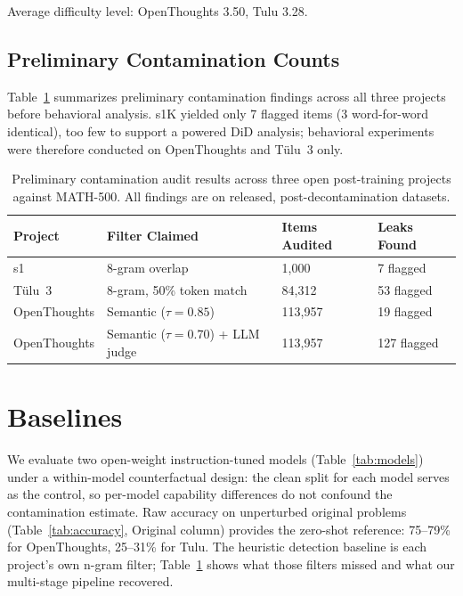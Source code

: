 \documentclass{article} %
\begin{document}
Average difficulty level: OpenThoughts 3.50, Tulu 3.28.

\subsection{Preliminary Contamination Counts}

Table~\ref{tab:contam_counts} summarizes preliminary contamination findings across all three projects before behavioral analysis. s1K yielded only 7 flagged items (3 word-for-word identical), too few to support a powered DiD analysis; behavioral experiments were therefore conducted on OpenThoughts and T\"ulu~3 only.
\begin{table}[t]
\caption{Preliminary contamination audit results across three open post-training projects against MATH-500. All findings are on released, post-decontamination datasets.}
\label{tab:contam_counts}
\begin{center}
\begin{tabular}{llll}
\toprule
\textbf{Project} & \textbf{Filter Claimed} & \textbf{Items Audited} & \textbf{Leaks Found} \\
\midrule
s1 & 8-gram overlap & 1,000 & 7 flagged \\
T\"ulu~3 & 8-gram, 50\% token match & 84,312 & 53 flagged \\
OpenThoughts & Semantic ($\tau{=}0.85$) & 113,957 & 19 flagged \\
OpenThoughts & Semantic ($\tau{=}0.70$) + LLM judge & 113,957 & 127 flagged \\
\bottomrule
\end{tabular}
\end{center}
\end{table}

\section{Baselines}

We evaluate two open-weight instruction-tuned models (Table~\ref{tab:models}) under a within-model counterfactual design: the clean split for each model serves as the control, so per-model capability differences do not confound the contamination estimate. Raw accuracy on unperturbed original problems (Table~\ref{tab:accuracy}, Original column) provides the zero-shot reference: 75--79\% for OpenThoughts, 25--31\% for Tulu. The heuristic detection baseline is each project's own n-gram filter; Table~\ref{tab:contam_counts} shows what those filters missed and what our multi-stage pipeline recovered.
\end{document}
